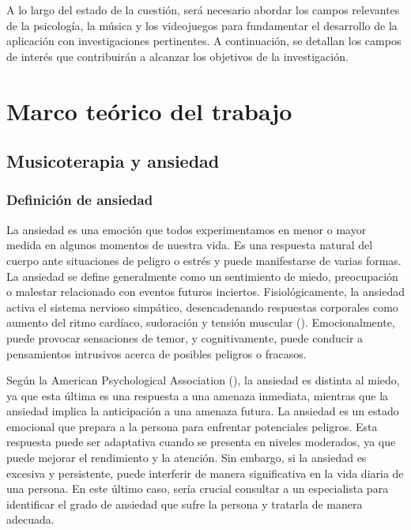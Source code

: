 A lo largo del estado de la cuestión, será necesario abordar los campos relevantes de la psicología, la música y los videojuegos para fundamentar el desarrollo de la aplicación con investigaciones pertinentes. A continuación, se detallan los campos de interés que contribuirán a alcanzar los objetivos de la investigación.

\section{Marco teórico del trabajo}

\subsection{Musicoterapia y ansiedad}

\subsubsection{Definición de ansiedad}

La ansiedad es una emoción que todos experimentamos en menor o mayor medida en algunos momentos de nuestra vida. Es una respuesta natural del cuerpo ante situaciones de peligro o estrés y puede manifestarse de varias formas. La ansiedad se define generalmente como un sentimiento de miedo, preocupación o malestar relacionado con eventos futuros inciertos. Fisiológicamente, la ansiedad activa el sistema nervioso simpático, desencadenando respuestas corporales como aumento del ritmo cardíaco, sudoración y tensión muscular (\cite{APA:2013}). Emocionalmente, puede provocar sensaciones de temor, y cognitivamente, puede conducir a pensamientos intrusivos acerca de posibles peligros o fracasos.

Según la American Psychological Association (\citeyear{APA:2020}), la ansiedad es distinta al miedo, ya que esta última es una respuesta a una amenaza inmediata, mientras que la ansiedad implica la anticipación a una amenaza futura. La ansiedad es un estado emocional que prepara a la persona para enfrentar potenciales peligros. Esta respuesta puede ser adaptativa cuando se presenta en niveles moderados, ya que puede mejorar el rendimiento y la atención. Sin embargo, si la ansiedad es excesiva y persistente, puede interferir de manera significativa en la vida diaria de una persona. En este último caso, sería crucial consultar a un especialista para identificar el grado de ansiedad que sufre la persona y tratarla de manera adecuada.

